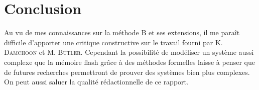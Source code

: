 \documentclass[12pt,a4paper,utf8x]{article}
\begin{document}
\section{Conclusion}
Au vu de mes connaissances sur la méthode B et ses extensions, il me paraît difficile d'apporter une critique constructive sur le travail fourni par K. \textsc{Damchoon} et M. \textsc{Butler}. Cependant la possibilité de modéliser un système aussi complexe que la mémoire flash grâce à des méthodes formelles laisse à penser que de futures recherches permettront de prouver des systèmes bien plus complexes. On peut aussi saluer la qualité rédactionnelle de ce rapport.




% 
%
% 
% 
% 


\printindex

\appendix


\end{document}
